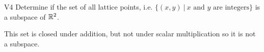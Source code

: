 \documentclass{sbgLAquiz}
\begin{document}
\begin{extract}\newpage\end{extract}
\begin{problem}{V4}
Determine if the set of all lattice points, i.e. $\{(x,y)\ \big|\ \text{$x$ and $y$ are integers} \}$ is a subspace of $\mathbb{R}^2$.
\end{problem}
\begin{solution}
This set is closed under addition, but not under scalar multiplication so it is not a subspace.
\end{solution}
\end{document}
